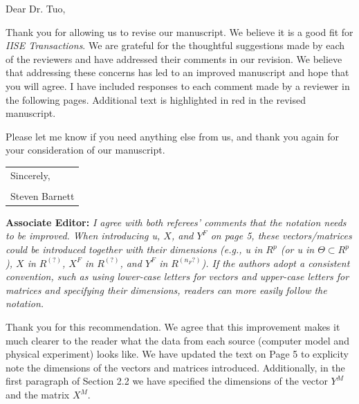 \documentclass[12pt]{article}
\begin{document}
\newcommand{\vect}[1]{\boldsymbol{#1}}
\renewcommand{\baselinestretch}{1.5} \small\normalsize


\bigskip
\noindent
Dear Dr. Tuo,

\medskip Thank you for allowing us to revise our manuscript. We 
believe it is a good fit for \textit{IISE Transactions}. We are grateful for
the thoughtful suggestions made by each of the reviewers and have addressed
their comments in our revision.  We believe that addressing these concerns has
led to an improved manuscript and hope that you will agree.  I have included
responses to each comment made by a reviewer in the following pages.
Additional text is highlighted in red in the revised manuscript.

Please let me know if you need anything else from us, and thank you again for your
consideration of our manuscript.

\vspace{0.25in}
\begin{center}
\begin{tabular}{l}
Sincerely,\\
\\
Steven Barnett
\end{tabular}
\end{center}

\bigskip
\renewcommand{\baselinestretch}{1.1} \small\normalsize

\pagebreak

\bigskip
\noindent
\textbf{Associate Editor:} \textit{I agree with both referees’ comments that
the notation needs to be improved. When introducing u, \(X\), and \(Y^F\) on
page 5, these vectors/matrices could be introduced together with their
dimensions (e.g., u in \(R^p\) (or u in \(\Theta \subset R^p\)), \(X\) in
\(R^{(?)}\), \(X^F\) in \(R^{(?)}\), and \(Y^F\) in \(R^{(n_F?)}\)). If the
authors adopt a consistent convention, such as using lower-case letters for
vectors and upper-case letters for matrices and specifying their dimensions,
readers can more easily follow the notation.}

\bigskip
\noindent
Thank you for this recommendation. We agree that this improvement makes it much
clearer to the reader what the data from each source (computer model and
physical experiment) looks like. We have updated the text on Page 5 to
explicity note the dimensions of the vectors and matrices introduced.
Additionally, in the first paragraph of Section 2.2 we have specified the
dimensions of the vector $Y^M$ and the matrix $X^M$.
\end{document}
